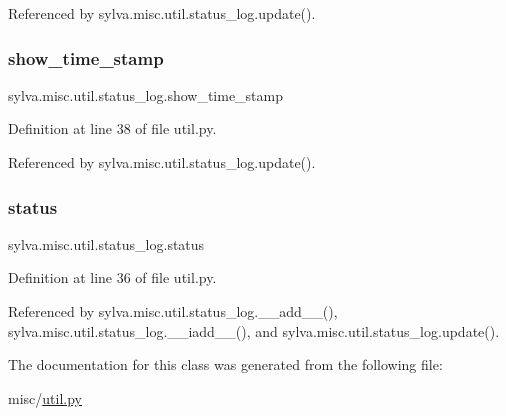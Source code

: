Referenced by sylva.\+misc.\+util.\+status\+\_\+log.\+update().

\mbox{\label{classsylva_1_1misc_1_1util_1_1status__log_a799f3dda1ada1a55c9febe98843c5ec6}} 
\subsubsection{\texorpdfstring{show\+\_\+time\+\_\+stamp}{show\_time\_stamp}}
{\footnotesize\ttfamily sylva.\+misc.\+util.\+status\+\_\+log.\+show\+\_\+time\+\_\+stamp}



Definition at line 38 of file util.\+py.



Referenced by sylva.\+misc.\+util.\+status\+\_\+log.\+update().

\mbox{\label{classsylva_1_1misc_1_1util_1_1status__log_a8e25853177439515a92f83c533247b46}} 
\subsubsection{\texorpdfstring{status}{status}}
{\footnotesize\ttfamily sylva.\+misc.\+util.\+status\+\_\+log.\+status}



Definition at line 36 of file util.\+py.



Referenced by sylva.\+misc.\+util.\+status\+\_\+log.\+\_\+\+\_\+add\+\_\+\+\_\+(), sylva.\+misc.\+util.\+status\+\_\+log.\+\_\+\+\_\+iadd\+\_\+\+\_\+(), and sylva.\+misc.\+util.\+status\+\_\+log.\+update().



The documentation for this class was generated from the following file\+:\begin{DoxyCompactItemize}
\item 
misc/\hyperlink{util_8py}{util.\+py}\end{DoxyCompactItemize}
